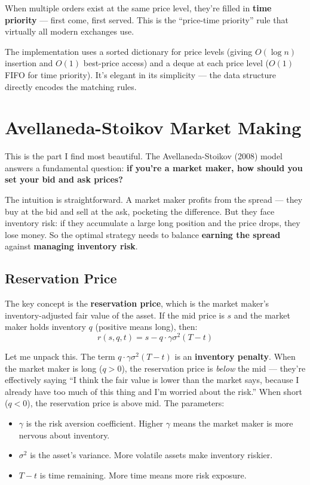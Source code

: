 \documentclass[11pt]{article}
\begin{document}
When multiple orders exist at the same price level, they're filled in \textbf{time priority} --- first come, first served. This is the ``price-time priority'' rule that virtually all modern exchanges use.

The implementation uses a sorted dictionary for price levels (giving $O(\log n)$ insertion and $O(1)$ best-price access) and a deque at each price level ($O(1)$ FIFO for time priority). It's elegant in its simplicity --- the data structure directly encodes the matching rules.

\section{Avellaneda-Stoikov Market Making}

This is the part I find most beautiful. The Avellaneda-Stoikov (2008) model answers a fundamental question: \textbf{if you're a market maker, how should you set your bid and ask prices?}

The intuition is straightforward. A market maker profits from the spread --- they buy at the bid and sell at the ask, pocketing the difference. But they face inventory risk: if they accumulate a large long position and the price drops, they lose money. So the optimal strategy needs to balance \textbf{earning the spread} against \textbf{managing inventory risk}.

\subsection{Reservation Price}

The key concept is the \textbf{reservation price}, which is the market maker's inventory-adjusted fair value of the asset. If the mid price is $s$ and the market maker holds inventory $q$ (positive means long), then:
\[
    r(s, q, t) = s - q \cdot \gamma \sigma^2 (T - t)
\]

Let me unpack this. The term $q \cdot \gamma \sigma^2 (T - t)$ is an \textbf{inventory penalty}. When the market maker is long ($q > 0$), the reservation price is \textit{below} the mid --- they're effectively saying ``I think the fair value is lower than the market says, because I already have too much of this thing and I'm worried about the risk.'' When short ($q < 0$), the reservation price is above mid. The parameters:

\begin{itemize}
    \item $\gamma$ is the risk aversion coefficient. Higher $\gamma$ means the market maker is more nervous about inventory.
    \item $\sigma^2$ is the asset's variance. More volatile assets make inventory riskier.
    \item $T - t$ is time remaining. More time means more risk exposure.
\end{itemize}
\end{document}

